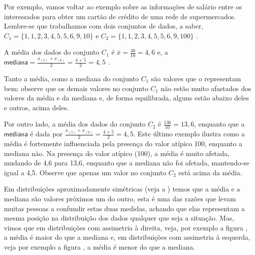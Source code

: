 Por exemplo, vamos voltar ao exemplo sobre as informações de salário entre os interessados para obter um cartão de crédito de uma rede de supermercados. Lembre-se que trabalhamos com dois conjuntos de dados, a saber, \(C_1=\{1, 1, 2, 3, 4, 5, 5, 6, 9, 10\}\) e \(C_2=\{1, 1, 2, 3, 4, 5, 5, 6, 9, 100\}\) .

A média dos dados do conjunto \(C_1\) é \(\bar{x}=\frac{46}{10}=4,6\) e, a \(\textsf{mediana}=\frac{x_{(5)}+x_{(6)}}{2}=\frac{4+5}{2}=4,5\) .

Tanto a média, como a mediana do conjunto \(C_1\) são valores que o representam bem: observe que os demais valores no conjunto \(C_1\) não estão muito afastados dos valores da média e da mediana e, de forma equilibrada, alguns estão abaixo deles e outros, acima deles.

Por outro lado, a média dos dados do conjunto \(C_2\) é \(\frac{136}{10}=13,6\), enquanto que a \(\textsf{mediana}\) é dada por  \(\frac{x_{(5)}+x_{(6)}}{2}=\frac{4+5}{2}=4,5\).  Este último exemplo ilustra como a média é fortemente influenciada pela presença do valor atípico 100, enquanto a mediana não.   Na presença do valor atípico (100), a média é muito afetada, mudando de 4,6 para 13,6, enquanto que a mediana não foi afetada, mantendo-se igual a 4,5.  Observe que apenas um valor no conjunto \(C_2\) está acima da média.

Em distribuições aproximadamente simétricas (veja a {\hyperref[\detokenize{PE104-1:fig-simetria}]{}} ) temos que a média e a mediana são valores próximos um do outro, esta é uma das razões que levam muitas pessoas a confundir estas duas medidas, achando que elas representam a mesma posição na distribuição dos dados qualquer que seja a situação. Mas, vimos que em distribuições com assimetria à direita, veja, por exemplo a figura  {\hyperref[\detokenize{PE104-1:fig-assimetriaadireita}]{}}, a média é maior do que a mediana e, em distribuições com assimetria à esquerda, veja por exemplo a figura {\hyperref[\detokenize{PE104-1:fig-assimetriaaesquerda}]{}}, a média é menor do que a mediana.



